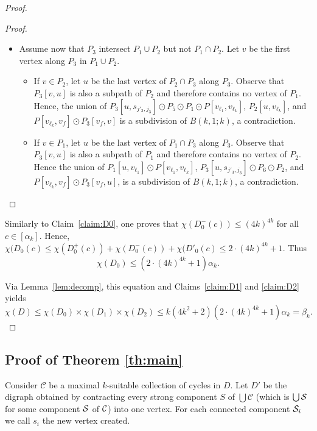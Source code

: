 \documentclass{endm}
\begin{document}
\begin{proof}
\begin{proof}
\begin{itemize}
	\item Assume now that $P_3$ intersect $P_1\cup P_2$ but not $P_1\cap P_2$. Let $v$ be the first vertex along $P_3$ in $P_1\cup P_2$.
	\begin{itemize}
	\item If $v \in P_2$, let $u$ be the last vertex of $P_2\cap P_3$ along $P_3$. Observe that $P_3[v,u]$ is also a subpath of $P_2$ and therefore contains no vertex of $P_1$. Hence, the union of $P_3[u, s_{j'_3,j_3}]\odot P_5 \odot P_1\odot P[v_{\ell_1},v_{\ell_k}]$,  $P_2[u,v_{\ell_k}]$, and $P[v_{\ell_k}, v_f] \odot P_3[v_f,v]$ is a subdivision of $B(k,1;k)$, a contradiction.
	
	
	\item If $v\in P_1$, let $u$ be the last vertex of $P_1\cap P_3$ along $P_3$.  Observe that $P_3[v,u]$ is also a subpath of $P_1$ and therefore contains no vertex of $P_2$. 
	Hence the union of $P_1[u, v_{\ell_1}]\odot P[v_{\ell_1}, v_{\ell_k}]$, $P_3[u, s_{j'_3,j_3}]\odot P_6 \odot P_2$, and $P[v_{\ell_k}, v_f] \odot P_3[v_f,u]$,  is a subdivision of $B(k,1;k)$, a contradiction.

	\end{itemize}

\end{itemize}
\end{proof}



Similarly to Claim~\ref{claim:D0}, one proves that $\chi(D^-_0(c))\leq (4k)^{4k}$ for all $c\in [\alpha_k]$.
Hence, $\chi(D_0(c) \leq \chi(D^+_0(c)) + \chi(D^-_0(c)) + \chi(D'_0(c) \leq 2\cdot (4k)^{4k} + 1$.
Thus  $$\chi(D_0) \leq (2\cdot (4k)^{4k} + 1) \alpha_k.$$


Via Lemma~\ref{lem:decomp}, this equation and Claims~\ref{claim:D1} and  \ref{claim:D2} yields 
$$\chi(D) \leq \chi(D_0)\times \chi(D_1) \times \chi(D_2) \leq k(4k^2+2)(2\cdot (4k)^{4k} + 1) \alpha_k = \beta_k.$$
\end{proof}





\subsection{Proof of Theorem \ref{th:main}}

Consider $\mathcal{C}$ be a maximal $k$-suitable collection of cycles in $D$. Let $D'$ be the digraph obtained by contracting 
every strong component $S$ of $\bigcup \mathcal{C}$ (which is $\bigcup {\cal S}$ for some component ${\cal S}$ of ${\cal C}$) into one vertex. For each connected component ${\cal S}_i$ we call $s_i$ the
new vertex created.
\end{document}
